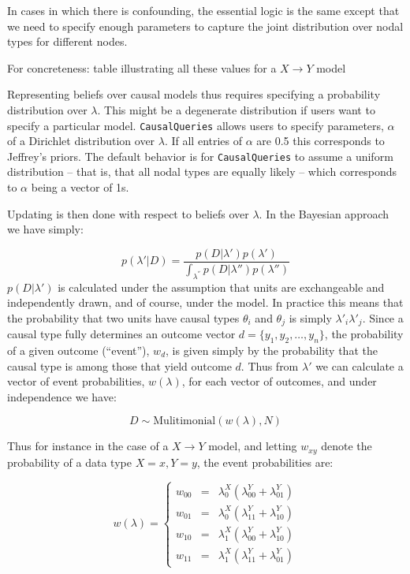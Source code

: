 \documentclass[
  article]{jss}
\begin{document}
In cases in which there is confounding, the essential logic is the same
except that we need to specify enough parameters to capture the joint
distribution over nodal types for different nodes.

For concreteness: table illustrating all these values for a
\(X\rightarrow Y\) model

Representing beliefs over causal models thus requires specifying a
probability distribution over \(\lambda\). This might be a degenerate
distribution if users want to specify a particular model.
\texttt{CausalQueries} allows users to specify parameters, \(\alpha\) of
a Dirichlet distribution over \(\lambda\). If all entries of \(\alpha\)
are 0.5 this corresponds to Jeffrey's priors. The default behavior is
for \texttt{CausalQueries} to assume a uniform distribution -- that is,
that all nodal types are equally likely -- which corresponds to
\(\alpha\) being a vector of 1s.

Updating is then done with respect to beliefs over \(\lambda\). In the
Bayesian approach we have simply:

\[p(\lambda'|D) = \frac{p(D|\lambda')p(\lambda')}{\int_{\lambda^{''}} p(D|\lambda'')p(\lambda'')}\]
\(p(D|\lambda')\) is calculated under the assumption that units are
exchangeable and independently drawn, and of course, under the model. In
practice this means that the probability that two units have causal
types \(\theta_i\) and \(\theta_j\) is simply \(\lambda'_i\lambda'_j\).
Since a causal type fully determines an outcome vector
\(d = \{y_1, y_2,\dots,y_n\}\), the probability of a given outcome
(``event''), \(w_d\), is given simply by the probability that the causal
type is among those that yield outcome \(d\). Thus from \(\lambda'\) we
can calculate a vector of event probabilities, \(w(\lambda)\), for each
vector of outcomes, and under independence we have:

\[D \sim \text{Mulitimonial}(w(\lambda), N)\]

Thus for instance in the case of a \(X \rightarrow Y\) model, and
letting \(w_{xy}\) denote the probability of a data type \(X=x, Y=y\),
the event probabilities are:

\[w(\lambda) = \left\{\begin{array}{ccc} w_{00} & = & \lambda^X_0(\lambda^Y_{00} + \lambda^Y_{01})\\ 
w_{01} & = & \lambda^X_0(\lambda^Y_{11} + \lambda^Y_{10})\\
w_{10} & = & \lambda^X_1(\lambda^Y_{00} + \lambda^Y_{10})\\
w_{11} & = & \lambda^X_1(\lambda^Y_{11} + \lambda^Y_{01})\end{array} \right.\]
\end{document}
